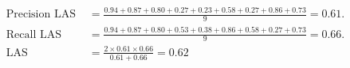 \documentclass[preview]{standalone}
\begin{document}
\begin{align*}
\begin{aligned}
        \text{Precision LAS } & = \frac{0.94 + 0.87 + 0.80 + 0.27 + 0.23 + 0.58 + 0.27 + 0.86 + 0.73}{9} = 0.61. \\[6pt] 
        \text{Recall LAS } & = \frac{0.94 + 0.87 + 0.80 + 0.53 + 0.38 + 0.86 + 0.58 + 0.27 + 0.73}{9} = 0.66. \\[6pt] 
        \text{LAS } & = \frac{2 \times 0.61 \times 0.66}{0.61 + 0.66} = 0.62
        \end{aligned}
\end{align*}
\end{document}
